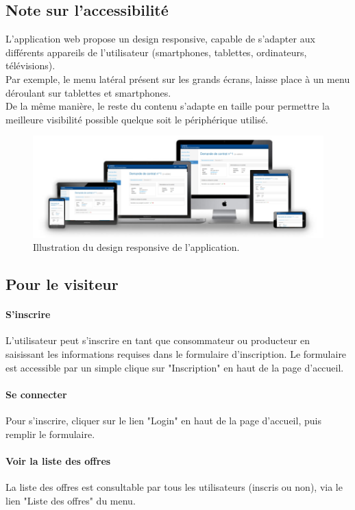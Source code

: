 \documentclass[12pt]{report}
\begin{document}
\subsection{Note sur l'accessibilité}
L'application web propose un design responsive, capable de s'adapter aux différents appareils de l'utilisateur (smartphones, tablettes, ordinateurs, télévisions).\\
Par exemple, le menu latéral présent sur les grands écrans, laisse place à un menu déroulant sur tablettes et smartphones.\\
De la même manière, le reste du contenu s'adapte en taille pour permettre la meilleure visibilité possible quelque soit le périphérique utilisé.

\begin{figure}[h]
\centering
\includegraphics[width=1.\textwidth]{./ressources/responsive_design.png}
\caption{Illustration du design responsive de l'application.}
\end{figure}


\subsection{Pour le visiteur}
\paragraph{S'inscrire}
L'utilisateur peut s'inscrire en tant que consommateur ou producteur en saisissant les informations requises dans le formulaire d'inscription.
Le formulaire est accessible par un simple clique sur "Inscription" en haut de la page d'accueil.

\paragraph{Se connecter}
Pour s'inscrire, cliquer sur le lien "Login" en haut de la page d'accueil, puis remplir le formulaire.

\paragraph{Voir la liste des offres}
La liste des offres est consultable par tous les utilisateurs (inscris ou non), via le lien "Liste des offres" du menu.
\end{document}

